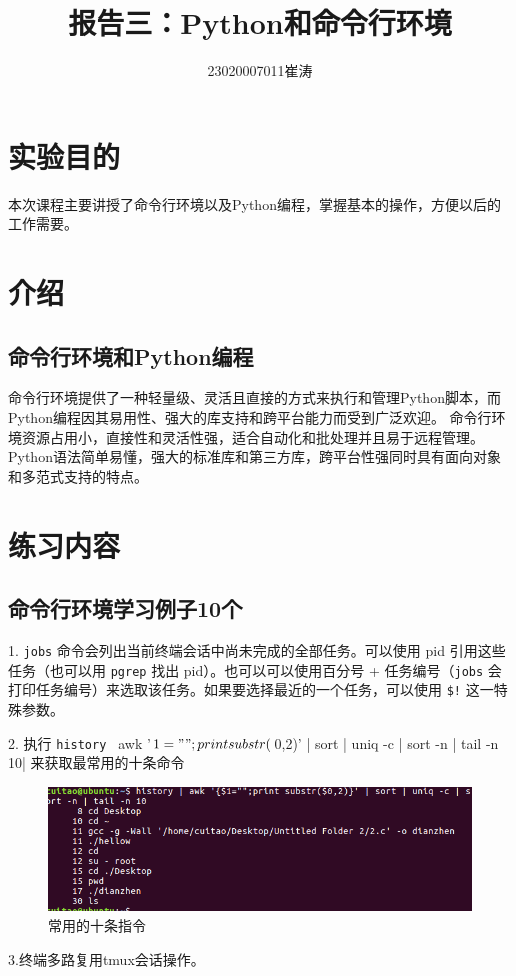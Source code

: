 \documentclass{article}
\title{报告三：Python和命令行环境}
\author{23020007011崔涛}
\begin{document}
\maketitle

\section{实验目的}
本次课程主要讲授了命令行环境以及Python编程，掌握基本的操作，方便以后的工作需要。

\section{介绍}
\subsection{命令行环境和Python编程}
命令行环境提供了一种轻量级、灵活且直接的方式来执行和管理Python脚本，而Python编程因其易用性、强大的库支持和跨平台能力而受到广泛欢迎。
命令行环境资源占用小，直接性和灵活性强，适合自动化和批处理并且易于远程管理。Python语法简单易懂，强大的标准库和第三方库，跨平台性强同时具有面向对象和多范式支持的特点。
\section{练习内容}
\subsection{命令行环境学习例子10个}
1. \verb|jobs| 命令会列出当前终端会话中尚未完成的全部任务。可以使用 pid 引用这些任务（也可以用 \verb|pgrep| 找出 pid）。也可以可以使用百分号 + 任务编号（\verb|jobs| 会打印任务编号）来选取该任务。如果要选择最近的一个任务，可以使用 \verb|$!| 这一特殊参数。 

2. 执行 \verb|history | awk '{$1="";print substr($0,2)}' | sort | uniq -c | sort -n | tail -n 10| 来获取最常用的十条命令 
\begin{figure}
    \centering
    \includegraphics[width=0.5\linewidth]{常用的十条指令.png}
    \caption{常用的十条指令}
    \label{fig:enter-label}
\end{figure}

3.终端多路复用tmux会话操作。
\end{document}
